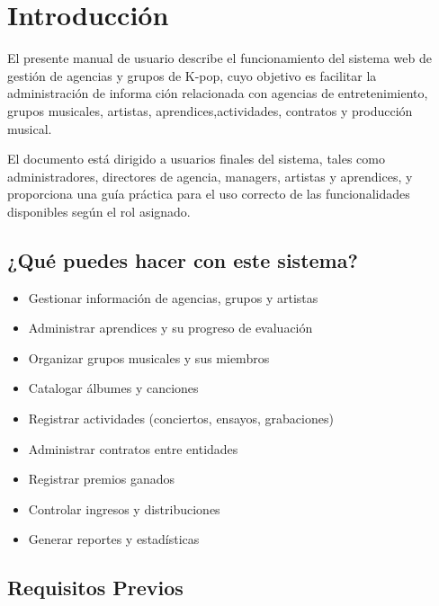 \documentclass[12pt,a4paper,spanish,oneside]{report}
\begin{document}
\newpage

\tableofcontents
\newpage

\chapter{Introducción}

El presente manual de usuario describe el funcionamiento del sistema web de gestión
de agencias y grupos de K-pop, cuyo objetivo es facilitar la administración de información relacionada con agencias de entretenimiento, grupos musicales, artistas, aprendices,actividades, contratos y producción musical.

\vspace{0.3cm}

El documento está dirigido a usuarios finales del sistema, tales como administradores,
directores de agencia, managers, artistas y aprendices, y proporciona una guía práctica
para el uso correcto de las funcionalidades disponibles según el rol asignado.

\section{¿Qué puedes hacer con este sistema?}

\begin{itemize}
    \item[\checkmark] Gestionar información de agencias, grupos y artistas
    \item[\checkmark] Administrar aprendices y su progreso de evaluación
    \item[\checkmark] Organizar grupos musicales y sus miembros
    \item[\checkmark] Catalogar álbumes y canciones
    \item[\checkmark] Registrar actividades (conciertos, ensayos, grabaciones)
    \item[\checkmark] Administrar contratos entre entidades
    \item[\checkmark] Registrar premios ganados
    \item[\checkmark] Controlar ingresos y distribuciones
    \item[\checkmark] Generar reportes y estadísticas
\end{itemize}

\section{Requisitos Previos}
\end{document}
